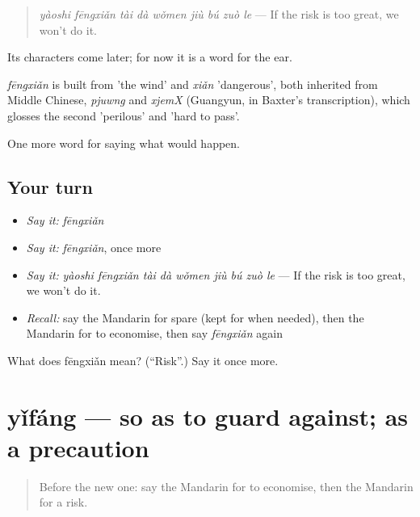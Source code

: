 \begin{quote}
\emph{yàoshi fēngxiǎn tài dà wǒmen jiù bú zuò le} — If the risk is too great, we won't do it.
\end{quote}

Its characters come later; for now it is a word for the ear.

\begin{cousinweb}
\emph{fēngxiǎn} is built from  'the wind' and \emph{xiǎn} 'dangerous', both inherited from Middle Chinese, \emph{pjuwng} and \emph{xjemX} (Guangyun, in Baxter's transcription), which glosses the second 'perilous' and 'hard to pass'.
\end{cousinweb}

\begin{grammarlens}[title={What you've built}]
One more word for saying what would happen.
\end{grammarlens}

\subsection*{Your turn}
\begin{itemize}
\raggedright
  \item \emph{Say it:} \emph{fēngxiǎn}
  \item \emph{Say it:} \emph{fēngxiǎn}, once more
  \item \emph{Say it:} \emph{yàoshi fēngxiǎn tài dà wǒmen jiù bú zuò le} — If the risk is too great, we won't do it.
  \item \emph{Recall:} say the Mandarin for spare (kept for when needed), then the Mandarin for to economise, then say \emph{fēngxiǎn} again
\end{itemize}

\begin{tcolorbox}[breakable,colback=teal!4,colframe=teal!35!black,title={Before you move on}]
What does fēngxiǎn mean? (\textquotedblleft{}Risk\textquotedblright{}.) Say it once more.
\end{tcolorbox}
\section[yǐfáng]{yǐfáng — so as to guard against; as a precaution}

\label{lesson:ZH-C389-yifang}



\begin{quote}
Before the new one: say the Mandarin for to economise, then the Mandarin for a risk.
\end{quote}

